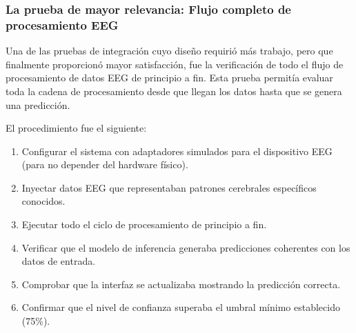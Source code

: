 \begin{table}[ht]
    \centering
    \small
    \caption{Resultados de pruebas de integración}
    \label{tab:integration_tests}
\end{table}

\subsubsection{La prueba de mayor relevancia: Flujo completo de procesamiento EEG}

Una de las pruebas de integración cuyo diseño requirió más trabajo, pero que finalmente proporcionó mayor satisfacción, fue la verificación de todo el flujo de procesamiento de datos EEG de principio a fin. Esta prueba permitía evaluar toda la cadena de procesamiento desde que llegan los datos hasta que se genera una predicción.

El procedimiento fue el siguiente:
\begin{enumerate}
    \item Configurar el sistema con adaptadores simulados para el dispositivo EEG (para no depender del hardware físico).
    \item Inyectar datos EEG que representaban patrones cerebrales específicos conocidos.
    \item Ejecutar todo el ciclo de procesamiento de principio a fin.
    \item Verificar que el modelo de inferencia generaba predicciones coherentes con los datos de entrada.
    \item Comprobar que la interfaz se actualizaba mostrando la predicción correcta.
    \item Confirmar que el nivel de confianza superaba el umbral mínimo establecido (75\%).
\end{enumerate}

